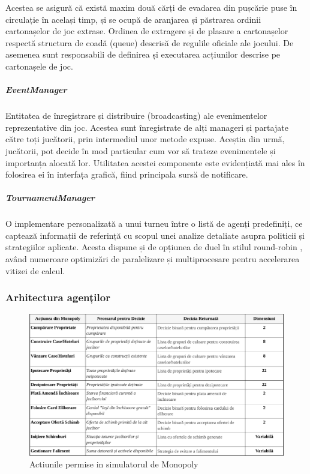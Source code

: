 Acestea se asigură că există maxim două cărți de evadarea din pușcărie puse în circulație în același timp, și se ocupă de aranjarea și păstrarea ordinii cartonașelor de joc extrase. Ordinea de extragere și de plasare a cartonașelor respectă structura de coadă (queue) \cite{geeksforgeeks_queue} descrisă de regulile oficiale ale jocului. De asemenea sunt responsabili de definirea și executarea acțiunilor descrise pe cartonașele de joc.
\subparagraph{EventManager}\label{event-manager}
Entitatea de înregistrare și distribuire (broadcasting) ale evenimentelor reprezentative din joc. Acestea sunt înregistrate de alți manageri și partajate către toți jucătorii, prin intermediul unor metode expuse. Aceștia din urmă, jucătorii, pot decide în mod particular cum vor să trateze evenimentele și importanța alocată lor. Utilitatea acestei componente este evidențiată mai ales în folosirea ei în interfața grafică, fiind principala sursă de notificare.
\subparagraph{TournamentManager}\label{trade-manager}
O implementare personalizată a unui turneu între o listă de agenți predefiniți, ce captează informații de referință cu scopul unei analize detaliate asupra politicii și strategiilor aplicate. Acesta dispune și de opțiunea de duel în stilul round-robin \cite{wikipedia_roundrobin}, având numeroare optimizări de paralelizare și multiprocesare pentru accelerarea vitizei de calcul.

\subsubsection{Arhitectura agenților}

\begin{figure}[h]
    \centering
    \includegraphics[width=16cm]{images/monopoly_actions_html_table (1).png}
    \caption{Actiunile permise in simulatorul de Monopoly}
    \label{fig:monopoly_actions}
\end{figure}

